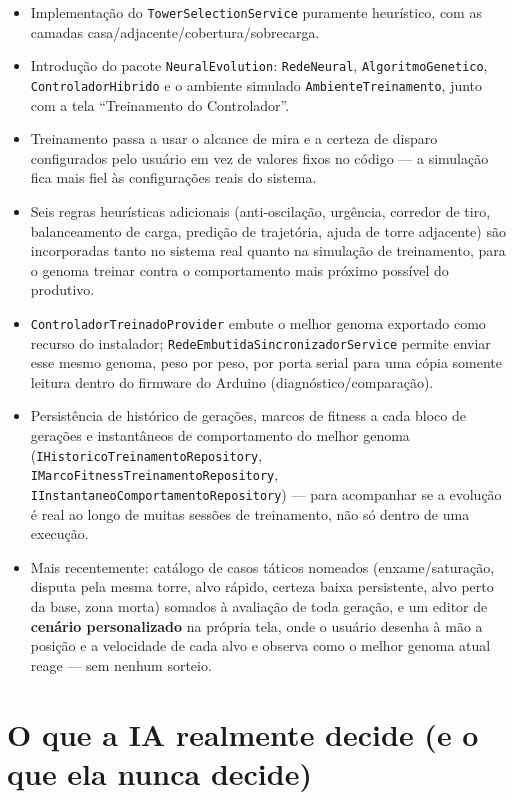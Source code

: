 \documentclass[11pt,a4paper]{article}
\begin{document}
\begin{itemize}[leftmargin=1.4em]
  \item Implementação do \texttt{TowerSelectionService} puramente heurístico, com as camadas
    casa/adjacente/cobertura/sobrecarga.
  \item Introdução do pacote \texttt{NeuralEvolution}: \texttt{RedeNeural},
    \texttt{AlgoritmoGenetico}, \texttt{ControladorHibrido} e o ambiente simulado
    \texttt{AmbienteTreinamento}, junto com a tela ``Treinamento do Controlador''.
  \item Treinamento passa a usar o alcance de mira e a certeza de disparo configurados pelo
    usuário em vez de valores fixos no código — a simulação fica mais fiel às configurações
    reais do sistema.
  \item Seis regras heurísticas adicionais (anti-oscilação, urgência, corredor de tiro,
    balanceamento de carga, predição de trajetória, ajuda de torre adjacente) são incorporadas
    tanto no sistema real quanto na simulação de treinamento, para o genoma treinar contra o
    comportamento mais próximo possível do produtivo.
  \item \texttt{ControladorTreinadoProvider} embute o melhor genoma exportado como recurso do
    instalador; \texttt{RedeEmbutidaSincronizadorService} permite enviar esse mesmo genoma, peso
    por peso, por porta serial para uma cópia somente leitura dentro do firmware do Arduino
    (diagnóstico/comparação).
  \item Persistência de histórico de gerações, marcos de fitness a cada bloco de gerações e
    instantâneos de comportamento do melhor genoma (\texttt{IHistoricoTreinamentoRepository},
    \texttt{IMarcoFitnessTreinamentoRepository}, \texttt{IInstantaneoComportamentoRepository}) —
    para acompanhar se a evolução é real ao longo de muitas sessões de treinamento, não só
    dentro de uma execução.
  \item Mais recentemente: catálogo de casos táticos nomeados (enxame/saturação, disputa pela
    mesma torre, alvo rápido, certeza baixa persistente, alvo perto da base, zona morta) somados
    à avaliação de toda geração, e um editor de \textbf{cenário personalizado} na própria tela,
    onde o usuário desenha à mão a posição e a velocidade de cada alvo e observa como o melhor
    genoma atual reage — sem nenhum sorteio.
\end{itemize}

\section{O que a IA realmente decide (e o que ela nunca decide)}
\end{document}
